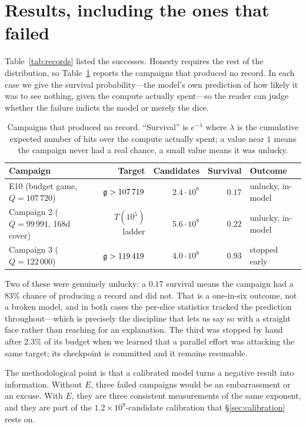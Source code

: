\section{Results, including the ones that failed}\label{sec:campaigns}

Table~\ref{tab:records} listed the successes. Honesty requires the rest of the
distribution, so Table~\ref{tab:campaigns} reports the campaigns that produced
no record. In each case we give the survival probability---the model's own
prediction of how likely it was to see nothing, given the compute actually
spent---so the reader can judge whether the failure indicts the model or merely
the dice.

\begin{table}[h]
\centering\small
\caption{Campaigns that produced no record. ``Survival'' is $e^{-\lambda}$ where
$\lambda$ is the cumulative expected number of hits over the compute actually
spent; a value near $1$ means the campaign never had a real chance, a small
value means it was unlucky.}\label{tab:campaigns}
\begin{tabular}{lrrrl}
\toprule
Campaign & Target & Candidates & Survival & Outcome\\
\midrule
E10 (budget game, $Q=107\,720$) & $\mathfrak{g}>107\,719$ & $2.4\cdot10^{8}$ & $0.17$ & unlucky, in-model\\
Campaign 2 ($Q=99\,991$, 168d cover) & $T(10^5)$ ladder & $5.6\cdot10^{8}$ & $0.22$ & unlucky, in-model\\
Campaign 3 ($Q=122\,000$) & $\mathfrak{g}>119\,419$ & $4.0\cdot10^{8}$ & $0.93$ & stopped early\\
\bottomrule
\end{tabular}
\end{table}

Two of these were genuinely unlucky: a $0.17$ survival means the campaign had a
$83\%$ chance of producing a record and did not. That is a one-in-six outcome,
not a broken model, and in both cases the per-slice statistics tracked the
prediction throughout---which is precisely the discipline that lets us say so
with a straight face rather than reaching for an explanation. The third was
stopped by hand after $2.3\%$ of its budget when we learned that a parallel
effort was attacking the same target; its checkpoint is committed and it remains
resumable.

The methodological point is that a calibrated model turns a negative result into
information. Without $E$, three failed campaigns would be an embarrassment or an
excuse. With $E$, they are three consistent measurements of the same exponent,
and they are part of the $1.2\times10^{9}$-candidate calibration that
\S\ref{sec:calibration} rests on.

